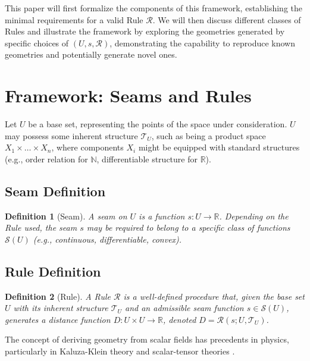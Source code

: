 \documentclass[twoside,twocolumn]{article}
\newtheorem{definition}{Definition}[subsection]
\numberwithin{equation}{section} %
\begin{document}
This paper will first formalize the components of this framework, establishing the minimal requirements for a valid Rule $\mathcal{R}$. We will then discuss different classes of Rules and illustrate the framework by exploring the geometries generated by specific choices of $(U, s, \mathcal{R})$, demonstrating the capability to reproduce known geometries and potentially generate novel ones.


\section{Framework: Seams and Rules}

Let $U$ be a base set, representing the points of the space under consideration. $U$ may possess some inherent structure $\mathcal{T}_U$, such as being a product space $X_1 \times \dots \times X_n$, where components $X_i$ might be equipped with standard structures (e.g., order relation for $\mathbb{N}$, differentiable structure for $\mathbb{R}$).

\setcounter{subsection}{0} %
\subsection{Seam Definition} %
\begin{definition}[Seam]
A \emph{seam} on $U$ is a function $s: U \to \mathbb{R}$. Depending on the Rule used, the seam $s$ may be required to belong to a specific class of functions $\mathcal{S}(U)$ (e.g., continuous, differentiable, convex).
\end{definition}

\subsection{Rule Definition} %
\begin{definition}[Rule]
A \emph{Rule} $\mathcal{R}$ is a well-defined procedure that, given the base set $U$ with its inherent structure $\mathcal{T}_U$ and an admissible seam function $s \in \mathcal{S}(U)$, generates a distance function $D: U \times U \to \mathbb{R}$, denoted $D = \mathcal{R}(s; U, \mathcal{T}_U)$.
\end{definition}
The concept of deriving geometry from scalar fields has precedents in physics, particularly in Kaluza-Klein theory \cite{Kaluza1921,Klein1926} and scalar-tensor theories \cite{BransDicke1961}.
\end{document}
